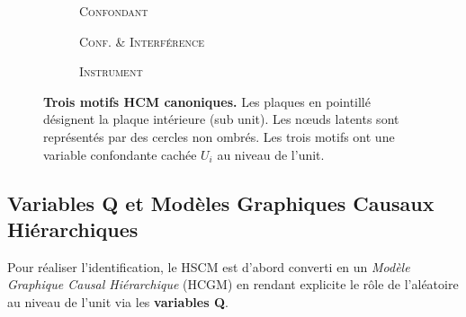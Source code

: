 \documentclass[11pt,a4paper]{article}
\begin{document}
\begin{figure}[h!]
\centering
\begin{subfigure}[t]{0.30\textwidth}
\caption{\textsc{Confondant}} \label{fig:hcm_conf}
\centering
{}
\end{subfigure}
\hfill
\begin{subfigure}[t]{0.30\textwidth}
\caption{\textsc{Conf. \& Interférence}} \label{fig:hcm_int}
\centering
{}
\end{subfigure}
\hfill
\begin{subfigure}[t]{0.30\textwidth}
\caption{\textsc{Instrument}} \label{fig:hcm_instr}
\centering
{}
\end{subfigure}
\caption{\textbf{Trois motifs HCM canoniques.} Les plaques en pointillé désignent la plaque intérieure (sub unit). Les nœuds latents sont représentés par des cercles non ombrés. Les trois motifs ont une variable confondante cachée $U_i$ au niveau de l'unit.}
\label{fig:motifs}
\end{figure}

\subsection{Variables Q et Modèles Graphiques Causaux Hiérarchiques}

Pour réaliser l'identification, le HSCM est d'abord converti en un \emph{Modèle Graphique Causal Hiérarchique} (HCGM) en rendant explicite le rôle de l'aléatoire au niveau de l'unit via les \textbf{variables Q}.
\end{document}
